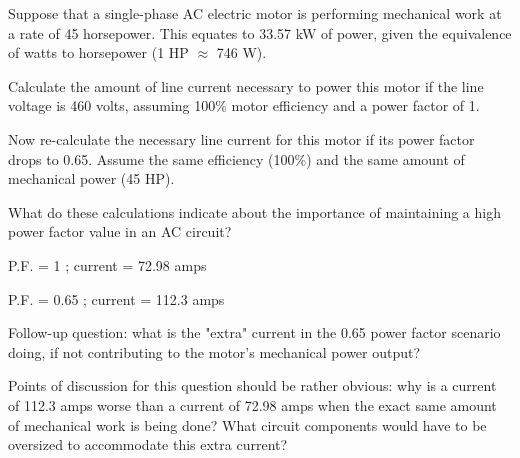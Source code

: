 

Suppose that a single-phase AC electric motor is performing mechanical work at a rate of 45 horsepower.  This equates to 33.57 kW of power, given the equivalence of watts to horsepower (1 HP $\approx$ 746 W).

Calculate the amount of line current necessary to power this motor if the line voltage is 460 volts, assuming 100\% motor efficiency and a power factor of 1.

Now re-calculate the necessary line current for this motor if its power factor drops to 0.65.  Assume the same efficiency (100\%) and the same amount of mechanical power (45 HP).

What do these calculations indicate about the importance of maintaining a high power factor value in an AC circuit?







P.F. = 1 ; current = 72.98 amps

\vskip 10pt

P.F. = 0.65 ; current = 112.3 amps

\vskip 10pt

Follow-up question: what is the "extra" current in the 0.65 power factor scenario doing, if not contributing to the motor's mechanical power output?







Points of discussion for this question should be rather obvious: why is a current of 112.3 amps worse than a current of 72.98 amps when the exact same amount of mechanical work is being done?  What circuit components would have to be oversized to accommodate this extra current?




